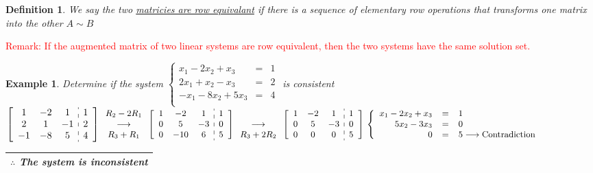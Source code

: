 \documentclass[a4paper,12pt,openany]{book}
\theoremstyle{defn}
\newtheorem{defn}{Definition}[section]
\theoremstyle{expl}
\newtheorem{expl}{Example}[section]
\begin{document}
	\begin{defn}
		\textup{We say the two \underline{matricies are row equivalant} if there is a sequence of elementary row operations that
		transforms one matrix into the other $A\sim B$}
	\end{defn}
	\textcolor{red}{
	Remark: If the augmented matrix of two linear systems are row equivalent, 
			then the two systems have the same solution set.}
	\begin{expl}
		\textup{Determine if the system 
		$\left\{\begin{array}{rcc}
			x_1-2x_2+x_3&=&1\\
			2x_1+x_2-x_3&=&2\\
			-x_1-8x_2+5x_3&=&4\\
		\end{array} \right.$ is consistent}\\
		$\left[\begin{array}{ccc:c}
			1&-2&1&1\\
			2&1&-1&2\\
			-1&-8&5&4
		\end{array}\right]
		\small{\begin{array}{c}
			R_2-2R_1\\
			\longrightarrow\\
			R_3+R_1\\
		\end{array}}
		\left[\begin{array}{ccc:c}
			1&-2&1&1\\
			0&5&-3&0\\
			0&-10&6&5
		\end{array}\right]
		\small{\begin{array}{c}
			\\
			\longrightarrow\\
			R_3+2R_2\\
		\end{array}}
		\left[\begin{array}{ccc:c}
			1&-2&1&1\\
			0&5&-3&0\\
			0&0&0&5
		\end{array}\right]\\
		\left\{\begin{array}{rcl}
			x_1-2x_2+x_3&=&1\\
			5x_2-3x_3&=&0\\
			0&=&5\longrightarrow\textup{Contradiction}
		\end{array}\right.$
		\begin{tabular}{|c|}
		\hline
		\textup{$\therefore$ The system is inconsistent}\\
		\hline
		\end{tabular}
	\end{expl} 
\end{document}
